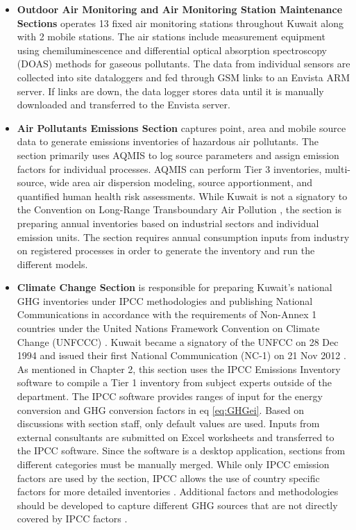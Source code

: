 \begin{itemize}
\item \textbf{Outdoor Air Monitoring and Air Monitoring Station Maintenance Sections}  operates 13 fixed air monitoring stations throughout Kuwait along with 2 mobile stations. The air stations include measurement equipment using  chemiluminescence and differential optical absorption spectroscopy (DOAS) methods for gaseous pollutants. The data from individual sensors are collected into site dataloggers and fed through GSM links to an Envista ARM server. If links are down, the data logger stores data until it is manually downloaded and transferred to the Envista server. 

\item \textbf{Air Pollutants Emissions Section} captures point, area and mobile source data to generate emissions inventories of hazardous air pollutants. The section primarily uses AQMIS to log source parameters and assign emission factors for individual processes. AQMIS can perform Tier 3 inventories, multi-source, wide area air dispersion modeling, source apportionment, and quantified human health risk assessments. While Kuwait is not a signatory to the Convention on Long-Range Transboundary Air Pollution \citep{UN1979}, the section is preparing annual inventories based on industrial sectors and individual emission units. The section requires annual consumption inputs from industry  on registered processes in order to generate the inventory and run the different models.

\item \textbf{Climate Change Section} is responsible for preparing Kuwait's  national GHG inventories under IPCC methodologies and publishing National Communications in accordance with the requirements of  Non-Annex 1 countries under the United Nations Framework Convention on Climate Change (UNFCCC) \citep{unfccc2014}. Kuwait became a signatory of the UNFCC on 28 Dec 1994 and issued their first National Communication (NC-1) on 21 Nov 2012 \citep{kepa2012}. As mentioned in Chapter 2, this section uses the IPCC Emissions Inventory software to compile a Tier 1 inventory from subject experts outside of the department. The IPCC software provides ranges of input for the energy conversion and GHG conversion factors in eq \ref{eq:GHGei}. Based on discussions with section staff, only default values are used. Inputs from external consultants are submitted on Excel worksheets and transferred to the IPCC software. Since the software is a desktop application, sections from different categories must be manually merged. While only IPCC emission factors are used by the section, IPCC allows the use of country specific factors for more detailed inventories \citep{ipcc2006}. Additional factors and methodologies should be developed to capture different GHG sources that are not directly covered by IPCC factors \citep{Freeman2018}.


\end{itemize}
